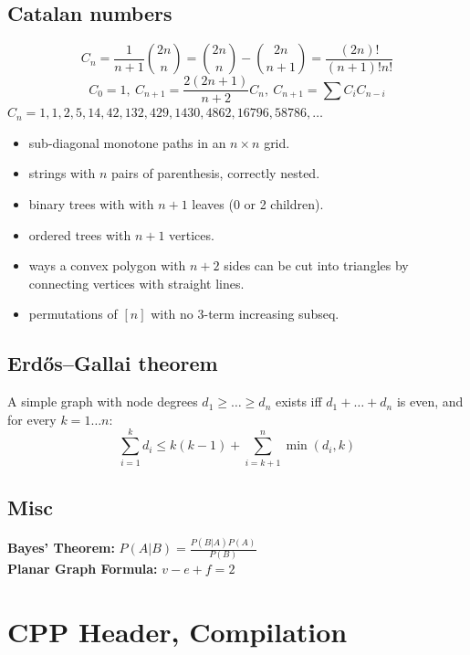 \documentclass[letterpaper,landscape]{article}
\newcommand{\DD}{\displaystyle}
\begin{document}
\begin{multicols*}{3}
	\subsection{Catalan numbers}
	\[ C_n=\frac{1}{n+1}\binom{2n}{n}= \binom{2n}{n}-\binom{2n}{n+1} = \frac{(2n)!}{(n+1)!n!} \]
	\[ C_0=1,\ C_{n+1} = \frac{2(2n+1)}{n+2}C_n,\ C_{n+1}=\sum C_iC_{n-i} \]
	${C_n = 1, 1, 2, 5, 14, 42, 132, 429, 1430, 4862, 16796, 58786, \dots}$
	\begin{itemize}[noitemsep]
		\item sub-diagonal monotone paths in an $n\times n$ grid.
		\item strings with $n$ pairs of parenthesis, correctly nested.
		\item binary trees with with $n+1$ leaves (0 or 2 children).
		\item ordered trees with $n+1$ vertices.
		\item ways a convex polygon with $n+2$ sides can be cut into triangles by connecting vertices with straight lines.
		\item permutations of $[n]$ with no 3-term increasing subseq.
	\end{itemize}
	
	\subsection{Erd\H{o}s--Gallai theorem}
	A simple graph with node degrees $d_1 \geq \dots \geq d_n$ exists iff 
	$d_1 + \dots + d_n$ is even, and for every $k = 1 \dots n$:\\
	$$\DD \sum_{i=1}^k d_i \leq k(k-1) + \sum_{i=k+1}^n \min(d_i, k)$$
	
	\subsection{Misc}
	 \textbf{Bayes' Theorem:} $P(A | B) = \frac{P(B | A) P(A)}{P(B)}$\\
	 \textbf{Planar Graph Formula:} $v - e + f = 2$
	 
    \section{CPP Header, Compilation}
    \inputminted{cpp}{src/header.h}
\end{multicols*}  
  
\end{document}
